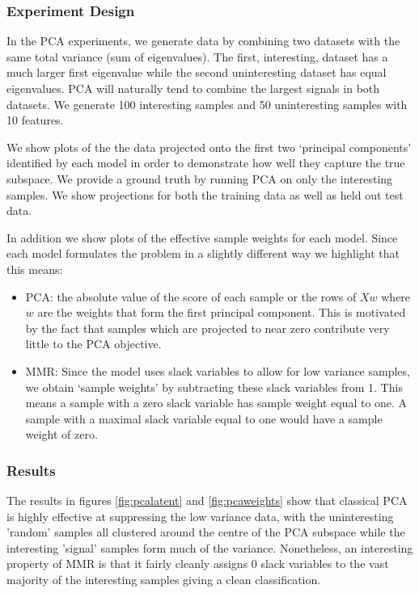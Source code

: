 \subsubsection{Experiment Design}

In the PCA experiments, we generate data by combining two datasets with the same total variance (sum of eigenvalues). The first, interesting, dataset has a much larger first eigenvalue while the second uninteresting dataset has equal eigenvalues. PCA will naturally tend to combine the largest signals in both datasets. We generate 100 interesting samples and 50 uninteresting samples with 10 features.

We show plots of the the data projected onto the first two `principal components' identified by each model in order to demonstrate how well they capture the true subspace. We provide a ground truth by running PCA on only the interesting samples. We show projections for both the training data as well as held out test data.

In addition we show plots of the effective sample weights for each model. Since each model formulates the problem in a slightly different way we highlight that this means:

\begin{itemize}
    \item PCA: the absolute value of the score of each sample or the rows of $Xw$ where $w$ are the weights that form the first principal component. This is motivated by the fact that samples which are projected to near zero contribute very little to the PCA objective.
    \item MMR: Since the model uses slack variables to allow for low variance samples, we obtain `sample weights' by subtracting these slack variables from 1. This means a sample with a zero slack variable has sample weight equal to one. A sample with a maximal slack variable equal to one would have a sample weight of zero.
\end{itemize}

\subsubsection{Results}

The results in figures \ref{fig:pcalatent} and \ref{fig:pcaweights} show that classical PCA is highly effective at suppressing the low variance data, with the uninteresting 'random' samples all clustered around the centre of the PCA subspace while the interesting 'signal' samples form much of the variance. Nonetheless, an interesting property of MMR is that it fairly cleanly assigns 0 slack variables to the vast majority of the interesting samples giving a clean classification. 

